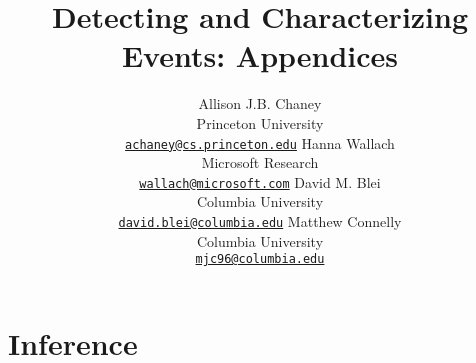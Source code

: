 \documentclass[11pt,letterpaper]{article}
\title{Detecting and Characterizing Events: Appendices}
\author{
Allison J.B. Chaney\\
    Princeton University\\
	\href{mailto:achaney@cs.princeton.edu}{\nolinkurl{achaney@cs.princeton.edu}}
\And
Hanna Wallach\\
    Microsoft Research\\
    \href{mailto:wallach@microsoft.com}{\nolinkurl{wallach@microsoft.com}}
\AND
David M. Blei\\
    Columbia University\\
    \href{mailto:david.blei@columbia.edu}{\nolinkurl{david.blei@columbia.edu}}
\And
Matthew Connelly\\
    Columbia University\\
    \href{mailto:mjc96@columbia.edu}{\nolinkurl{mjc96@columbia.edu}}
}
\date{}
\begin{document}
\maketitle

\appendix
\section{Inference}
\label{sec:inference}








\end{document}
